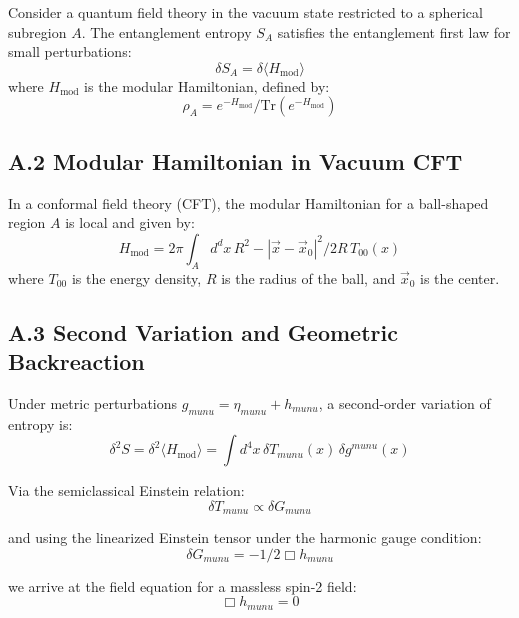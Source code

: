 \documentclass[11pt]{article}
\def\mu{mu}
\def\nu{nu}
\def\frac#1#2{#1/#2}
\begin{document}
Consider a quantum field theory in the vacuum state restricted to a spherical subregion $A$. The entanglement entropy $S_A$ satisfies the entanglement first law for small perturbations:
\begin{equation}
\delta S_A = \delta \langle H_{\text{mod}} \rangle
\end{equation}
where $H_{\text{mod}}$ is the modular Hamiltonian, defined by:
\begin{equation}
\rho_A = \frac{e^{-H_{\text{mod}}}}{\text{Tr}(e^{-H_{\text{mod}}})}
\end{equation}

\subsection*{A.2 Modular Hamiltonian in Vacuum CFT}

In a conformal field theory (CFT), the modular Hamiltonian for a ball-shaped region $A$ is local and given by:
\begin{equation}
H_{\text{mod}} = 2\pi \int_A d^d x \, \frac{R^2 - |\vec{x} - \vec{x}_0|^2}{2R} \, T_{00}(x)
\end{equation}
where $T_{00}$ is the energy density, $R$ is the radius of the ball, and $\vec{x}_0$ is the center.

\subsection*{A.3 Second Variation and Geometric Backreaction}

Under metric perturbations $g_{\mu\nu} = \eta_{\mu\nu} + h_{\mu\nu}$, a second-order variation of entropy is:
\begin{equation}
\delta^2 S = \delta^2 \langle H_{\text{mod}} \rangle = \int d^4x \, \delta T_{\mu\nu}(x) \, \delta g^{\mu\nu}(x)
\end{equation}

Via the semiclassical Einstein relation:
\begin{equation}
\delta T_{\mu\nu} \propto \delta G_{\mu\nu}
\end{equation}

and using the linearized Einstein tensor under the harmonic gauge condition:
\begin{equation}
\delta G_{\mu\nu} = -\frac{1}{2} \Box h_{\mu\nu}
\end{equation}

we arrive at the field equation for a massless spin-2 field:
\begin{equation}
\Box h_{\mu\nu} = 0
\end{equation}
\end{document}
